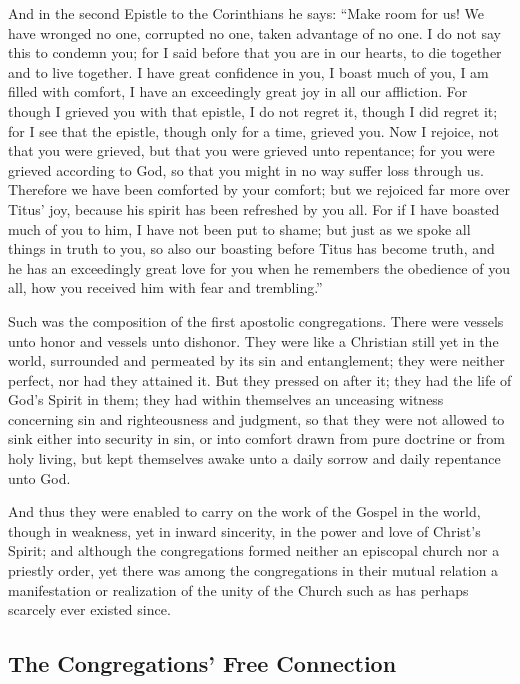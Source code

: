 And in the second Epistle to the Corinthians he says: “Make room for us! We have wronged no one, corrupted no one, taken advantage of no one. I do not say this to condemn you; for I said before that you are in our hearts, to die together and to live together. I have great confidence in you, I boast much of you, I am filled with comfort, I have an exceedingly great joy in all our affliction. For though I grieved you with that epistle, I do not regret it, though I did regret it; for I see that the epistle, though only for a time, grieved you. Now I rejoice, not that you were grieved, but that you were grieved unto repentance; for you were grieved according to God, so that you might in no way suffer loss through us. Therefore we have been comforted by your comfort; but we rejoiced far more over Titus’ joy, because his spirit has been refreshed by you all. For if I have boasted much of you to him, I have not been put to shame; but just as we spoke all things in truth to you, so also our boasting before Titus has become truth, and he has an exceedingly great love for you when he remembers the obedience of you all, how you received him with fear and trembling.”

Such was the composition of the first apostolic congregations. There were vessels unto honor and vessels unto dishonor. They were like a Christian still yet in the world, surrounded and permeated by its sin and entanglement; they were neither perfect, nor had they attained it. But they pressed on after it; they had the life of God’s Spirit in them; they had within themselves an unceasing witness concerning sin and righteousness and judgment, so that they were not allowed to sink either into security in sin, or into comfort drawn from pure doctrine or from holy living, but kept themselves awake unto a daily sorrow and daily repentance unto God.

And thus they were enabled to carry on the work of the Gospel in the world, though in weakness, yet in inward sincerity, in the power and love of Christ’s Spirit; and although the congregations formed neither an episcopal church nor a priestly order, yet there was among the congregations in their mutual relation a manifestation or realization of the unity of the Church such as has perhaps scarcely ever existed since.





\subsection{The Congregations’ Free Connection}

